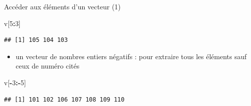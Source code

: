 \documentclass[
  ignorenonframetext,
]{beamer}
\newenvironment{Shaded}{\begin{snugshade}}{\end{snugshade}}
\newcommand{\DecValTok}[1]{\textcolor[rgb]{0.00,0.00,0.81}{#1}}
\newcommand{\NormalTok}[1]{#1}
\newcommand{\SpecialCharTok}[1]{\textcolor[rgb]{0.81,0.36,0.00}{\textbf{#1}}}
\providecommand{\tightlist}{%
  \setlength{\itemsep}{0pt}\setlength{\parskip}{0pt}}
\begin{document}
\begin{frame}[fragile]{Accéder aux éléments d'un vecteur (1)}
\tiny

\begin{Shaded}
\begin{Highlighting}[]
\NormalTok{v[}\DecValTok{5}\SpecialCharTok{:}\DecValTok{3}\NormalTok{]}
\end{Highlighting}
\end{Shaded}

\begin{verbatim}
## [1] 105 104 103
\end{verbatim}

\normalsize

\begin{itemize}
\tightlist
\item
  un vecteur de nombres entiers négatifs : pour extraire tous les
  éléments sauf ceux de numéro cités
\end{itemize}

\tiny

\begin{Shaded}
\begin{Highlighting}[]
\NormalTok{v[}\SpecialCharTok{{-}}\DecValTok{3}\SpecialCharTok{:{-}}\DecValTok{5}\NormalTok{]}
\end{Highlighting}
\end{Shaded}

\begin{verbatim}
## [1] 101 102 106 107 108 109 110
\end{verbatim}

\normalsize
\end{frame}
\end{document}
